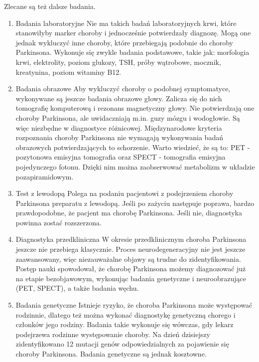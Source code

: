 Zlecane są też dalsze badania.
\renewcommand{\labelenumi}{\alph{enumi})}
\begin{enumerate}
	\item Badania laboratoryjne
Nie ma takich badań laboratoryjnych krwi, które stanowiłyby marker choroby i jednocześnie potwierdzały diagnozę.
Mogą one jednak wykluczyć inne choroby, które przebiegają podobnie do choroby Parkinsona.
Wykonuje się zwykle badania podstawowe, takie jak: morfologia krwi, elektrolity, poziom glukozy, TSH, próby wątrobowe, mocznik, kreatynina, poziom witaminy B12.

	\item Badania obrazowe
Aby wykluczyć choroby o podobnej symptomatyce, wykonywane są jeszcze badania obrazowe głowy.
Zalicza się do nich tomografię komputerową i rezonans magnetyczny głowy.
Nie potwierdzają one choroby Parkinsona, ale uwidaczniają m.in. guzy mózgu i wodogłowie.
Są więc niezbędne w diagnostyce różnicowej.
Międzynarodowe kryteria rozpoznania choroby Parkinsona nie wymagają wykonywania badań obrazowych potwierdzających to schorzenie.
Warto wiedzieć, że są to: PET - pozytonowa emisyjna tomografia oraz SPECT - tomografia emisyjna pojedynczego fotonu.
Dzięki nim można zaobserwować metabolizm w układzie pozapiramidowym.


	\item Test z lewodopą
Polega na podaniu pacjentowi z podejrzeniem choroby Parkinsona preparatu z lewodopą.
Jeśli po zażyciu następuje poprawa, bardzo prawdopodobne, że pacjent ma chorobę Parkinsona.
Jeśli nie, diagnostyka powinna zostać rozszerzona.


	\item Diagnostyka przedkliniczna
W okresie przedklinicznym choroba Parkinsona jeszcze nie przebiega klasycznie.
Proces neurodegeneracyjny nie jest jeszcze zaawansowany, więc niezauważalne objawy są trudne do zidentyfikowania.
Postęp nauki spowodował, że chorobę Parkinsona możemy diagnozować już na etapie bezobjawowym, wykonując badania genetyczne
i neuroobrazujące (PET, SPECT), a także badania węchu.

	\item Badania genetyczne
Istnieje ryzyko, że choroba Parkinsona może występować rodzinnie, dlatego też można wykonać diagnostykę genetyczną chorego i członków jego rodziny.
Badania takie wykonuje się wówczas, gdy lekarz podejrzewa rodzinne występowanie choroby.
Na dzień dzisiejszy zidentyfikowano 12 mutacji genów odpowiedzialnych za pojawienie się choroby Parkinsona.
Badania genetyczne są jednak kosztowne.


\end{enumerate}
